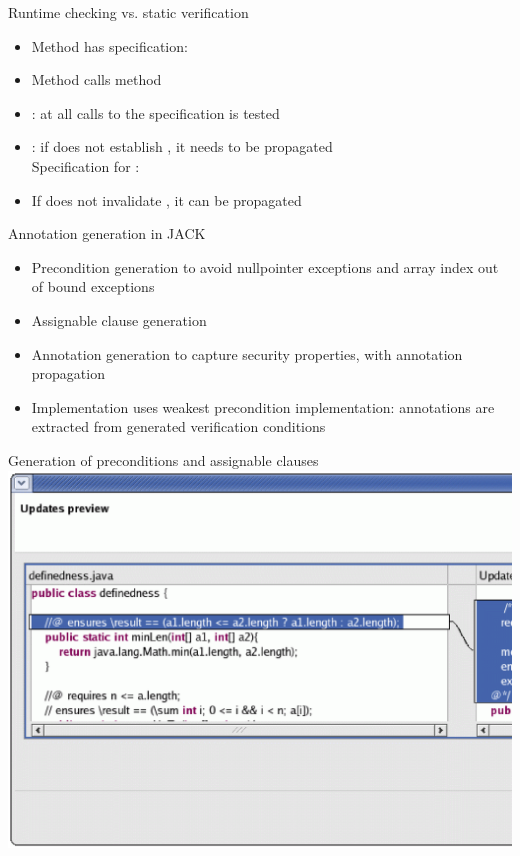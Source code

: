 \documentclass[final,nocolorBG,a4,mobius,nototal,pdf,slideColor]{prosper}
\begin{document}
\begin{slide}{Runtime checking vs. static verification}
\begin{itemize}
\item Method  has specification: 
\item Method  calls method \\
\item {}: at all calls to  the specification is
tested
\item {}: if  does not establish , it
needs to be propagated\\ Specification for :
\item If  does not invalidate , it can be
propagated
\end{itemize}
\end{slide}

\begin{slide}{Annotation generation in JACK}
\begin{itemize}
\item Precondition generation to avoid nullpointer exceptions and
array index out of bound exceptions
\item Assignable clause generation
\item Annotation generation to capture security properties, with
annotation propagation
\item Implementation uses weakest precondition implementation:
annotations are extracted from generated verification conditions
\end{itemize}
\end{slide}

\begin{slide}{Generation of preconditions and assignable clauses}
\includegraphics[width=\textwidth]{screen9.ps}
\end{slide}
\end{document}

